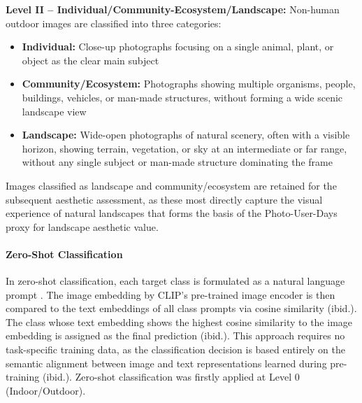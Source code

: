 \documentclass[hidelinks, 11pt]{article}
\begin{document}
\textbf{Level II -- Individual/Community-Ecosystem/Landscape:} Non-human outdoor images are classified into three categories:
\begin{itemize}
\item \textbf{Individual:} Close-up photographs focusing on a single animal, plant, or object as the clear main subject
\item \textbf{Community/Ecosystem:} Photographs showing multiple organisms, people, buildings, vehicles, or man-made structures, without forming a wide scenic landscape view
\item \textbf{Landscape:} Wide-open photographs of natural scenery, often with a visible horizon, showing terrain, vegetation, or sky at an intermediate or far range, without any single subject or man-made structure dominating the frame
\end{itemize}
Images classified as landscape and community/ecosystem are retained for the subsequent aesthetic assessment, as these most directly capture the visual experience of natural landscapes that forms the basis of the Photo-User-Days proxy for landscape aesthetic value.

\paragraph{Zero-Shot Classification}
In zero-shot classification, each target class is formulated as a natural language prompt \citep{radford_learning_2021}. The image embedding by CLIP's pre-trained image encoder is then compared to the text embeddings of all class prompts via cosine similarity (ibid.). The class whose text embedding shows the highest cosine similarity to the image embedding is assigned as the final prediction (ibid.). This approach requires no task-specific training data, as the classification decision is based entirely on the semantic alignment between image and text representations learned during pre-training (ibid.). Zero-shot classification was firstly applied at Level 0 (Indoor/Outdoor). 
\end{document}
